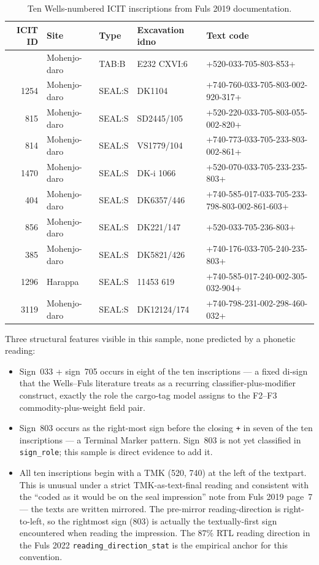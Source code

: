 \begin{longtable}{@{}rllll@{}}
\caption{Ten Wells-numbered ICIT inscriptions from Fuls 2019
documentation.}
\label{tab:icit-ten}\\
\toprule
ICIT ID & Site & Type & Excavation idno & Text code \\
\midrule
\endfirsthead
\bottomrule
\endlastfoot
1202 & Mohenjo-daro & TAB:B  & E232 CXVI:6  & +520-033-705-803-853+ \\
\midrule
1254 & Mohenjo-daro & SEAL:S & DK1104       & +740-760-033-705-803-002-920-317+ \\
\midrule
815  & Mohenjo-daro & SEAL:S & SD2445/105   & +520-220-033-705-803-055-002-820+ \\
\midrule
814  & Mohenjo-daro & SEAL:S & VS1779/104   & +740-773-033-705-233-803-002-861+ \\
\midrule
1470 & Mohenjo-daro & SEAL:S & DK-i 1066    & +520-070-033-705-233-235-803+ \\
\midrule
404  & Mohenjo-daro & SEAL:S & DK6357/446   & +740-585-017-033-705-233-798-803-002-861-603+ \\
\midrule
856  & Mohenjo-daro & SEAL:S & DK221/147    & +520-033-705-236-803+ \\
\midrule
385  & Mohenjo-daro & SEAL:S & DK5821/426   & +740-176-033-705-240-235-803+ \\
\midrule
1296 & Harappa      & SEAL:S & 11453 619    & +740-585-017-240-002-305-032-904+ \\
\midrule
3119 & Mohenjo-daro & SEAL:S & DK12124/174  & +740-798-231-002-298-460-032+ \\
\end{longtable}

\noindent
Three structural features visible in this sample, none predicted by a
phonetic reading:

\begin{itemize}
\item Sign~033 + sign~705 occurs in eight of the ten inscriptions
  --- a fixed di-sign that the Wells--Fuls
  literature\smartcite{Wells2015} treats as a recurring
  classifier-plus-modifier construct, exactly the role the
  cargo-tag model assigns to the F2--F3 commodity-plus-weight
  field pair.
\item Sign~803 occurs as the right-most sign before the closing
  \texttt{+} in seven of the ten inscriptions --- a Terminal
  Marker pattern. Sign~803 is not yet classified in
  \texttt{sign\_role}; this sample is direct evidence to add it.
\item All ten inscriptions begin with a TMK (520, 740) at the
  left of the textpart. This is unusual under a strict
  TMK-as-text-final reading and consistent with the
  ``coded as it would be on the seal impression'' note from
  Fuls 2019 page~7 --- the texts are written mirrored. The
  pre-mirror reading-direction is right-to-left, so the
  rightmost sign (803) is actually the textually-first sign
  encountered when reading the impression. The 87\% RTL reading
  direction in the Fuls 2022 \texttt{reading\_direction\_stat}
  is the empirical anchor for this convention.
\end{itemize}

